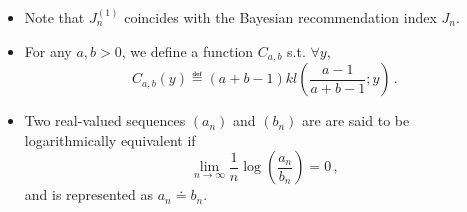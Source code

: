 \begin{itemize}
    \item Note that $J_n^{(1)}$ coincides with the Bayesian recommendation index $J_n$.
    \item For any $a, b > 0$, we define a function $C_{a,b}$ s.t. $\forall y$, 
    \[
        C_{a,b}(y) \eqdef (a+b-1) kl (\frac{a-1}{a+b-1}; y)\,.
    \]
    \item Two real-valued sequences $(a_n)$ and $(b_n)$ are are said to be logarithmically equivalent if
    \[
        \lim_{n\rightarrow\infty}\frac{1}{n}\log\left(\frac{a_n}{b_n}\right) = 0\,,
    \]
    and is represented as $a_n \doteq b_n$.
\end{itemize}
